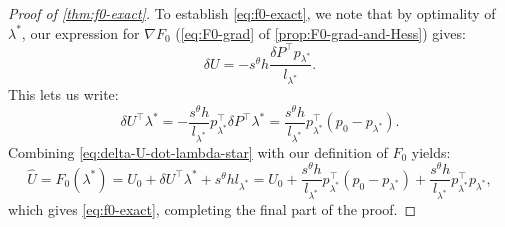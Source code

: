 \documentclass[sisc-eikonal.tex]{subfiles}
\begin{document}
\begin{proof}[Proof of \cref{thm:f0-exact}]
  To establish \cref{eq:f0-exact}, we note that by optimality of
  $\lambda^*$, our expression for $\nabla F_0$ (\cref{eq:F0-grad} of
  \cref{prop:F0-grad-and-Hess}) gives:
  \begin{equation}
    \delta U = -s^\theta h \frac{\delta P^\top p_{\lambda^*}}{l_{\lambda^*}}.
  \end{equation}
  This lets us write:
  \begin{equation}\label{eq:delta-U-dot-lambda-star}
    \delta U^\top \lambda^* = -\frac{s^\theta h}{l_{\lambda^*}} p_{\lambda^*}^\top \delta P^\top \lambda^* = \frac{s^\theta h}{l_{\lambda^*}} p_{\lambda^*}^\top {(p_0 - p_{\lambda^*})}.
  \end{equation}
  Combining \cref{eq:delta-U-dot-lambda-star} with our definition of
  $F_0$ yields:
  \begin{equation}
    \hat{U} = F_0(\lambda^*) = U_0 + \delta U^\top \lambda^* + s^\theta h l_{\lambda^*} = U_0 + \frac{s^\theta h}{l_{\lambda^*}} p_{\lambda^*}^\top {(p_0 - p_{\lambda^*})} + \frac{s^\theta h}{l_{\lambda^*}} p_{\lambda^*}^\top p_{\lambda^*},
  \end{equation}
  which gives \cref{eq:f0-exact}, completing the final part of the
  proof.
\end{proof}
\end{document}
